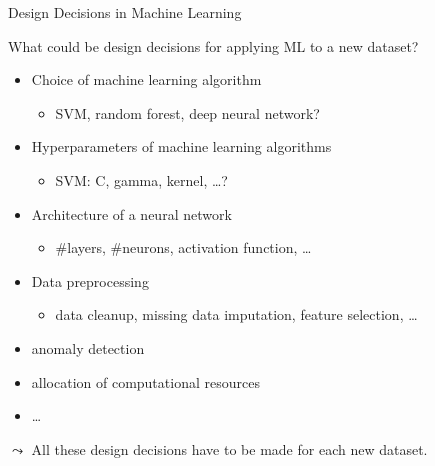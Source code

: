 \begin{frame}[c]{Design Decisions in Machine Learning}

What could be design decisions for applying ML to a new dataset?
\hands

\pause

\begin{itemize}
  \item Choice of machine learning algorithm
  \begin{itemize}
    \item SVM, random forest, deep neural network?
  \end{itemize}
  \pause
  \item Hyperparameters of machine learning algorithms
  \begin{itemize}
    \item SVM: C, gamma, kernel, \ldots?
  \end{itemize}
  \pause
  \item Architecture of a neural network
  \begin{itemize}
    \item $\#$layers, $\#$neurons, activation function, \ldots 
  \end{itemize}
  \pause
  \item Data preprocessing
  \begin{itemize}
  	\item data cleanup, missing data imputation, feature selection, \ldots  
  \end{itemize}
  \pause
  \item anomaly detection
  \item allocation of computational resources
  \item \ldots
\end{itemize}

\medskip
$\leadsto$ All these design decisions have to be made for each new dataset.

\end{frame}
